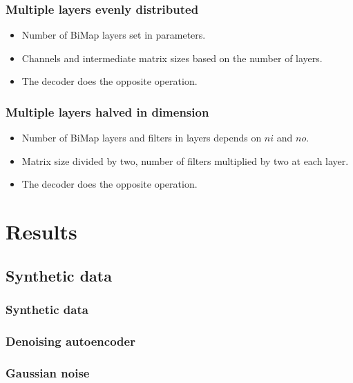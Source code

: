 \documentclass{beamer}
\begin{document}
\begin{frame}
\frametitle{Multiple layers evenly distributed}
\begin{itemize}
    \item Number of BiMap layers set in parameters.
    \item Channels and intermediate matrix sizes based on the number of layers.
    \item The decoder does the opposite operation.
\end{itemize}
\begin{center}
    {\tiny
    
    }
\end{center}
\end{frame}

\begin{frame}
\frametitle{Multiple layers halved in dimension}
\begin{itemize}
    \item Number of BiMap layers and filters in layers depends on $ni$ and $no$.
    \item Matrix size divided by two, number of filters multiplied by two at each layer.
    \item The decoder does the opposite operation.
\end{itemize}
\begin{center}
    {\tiny
    
    }
\end{center}

\end{frame}

\section{Results}

\subsection{Synthetic data}
\begin{frame}
\frametitle{Synthetic data}

\end{frame}

\begin{frame}
    \frametitle{Denoising autoencoder}
    
\end{frame}
\begin{frame}
    \frametitle{Gaussian noise}
    
\end{frame}
\end{document}
